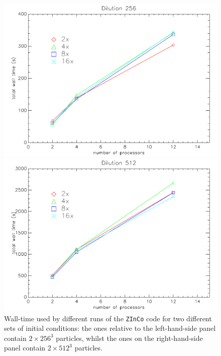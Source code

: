\documentclass[11pt,a4paper,titlepage]{article}
\newcommand{\zinco}{\texttt{ZInCo}\xspace}
\begin{document}
\begin{figure}[!tb]
\begin{minipage}{0.45\textwidth}
\includegraphics[width=\textwidth]{benchmark_wtaVSnp_256.pdf}
\end{minipage}
\begin{minipage}{0.45\textwidth}
\begin{flushright}
\includegraphics[width=\textwidth]{benchmark_wtaVSnp_512.pdf}
\end{flushright}
\end{minipage}
\caption{Wall-time used by different runs of the \zinco code for two different sets of initial conditions: the ones relative to the left-hand-side panel contain $2 \times 256^3$ particles, whilst the ones on the right-hand-side panel contain $2 \times 512^3$ particles.}
\label{benchmark_wtaVSnp}
\end{figure}
\end{document}
